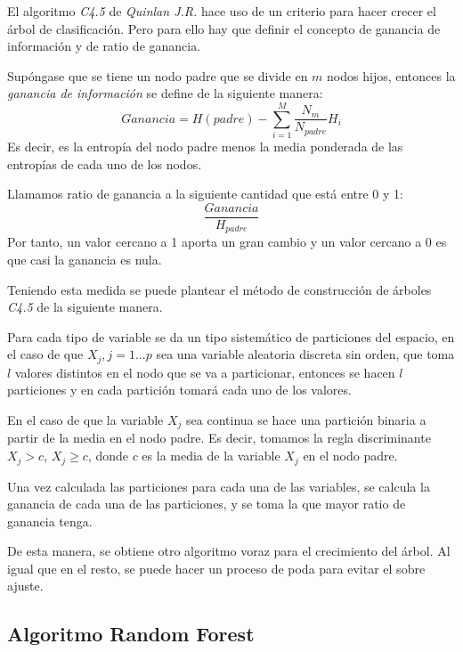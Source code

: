 \noindent El algoritmo \emph{C4.5} de \emph{Quinlan J.R.}\cite{Quinlan 2014} hace uso de un criterio para hacer crecer el árbol de clasificación. Pero para ello hay que definir el concepto de ganancia de información y de ratio de ganancia.
\begin{defi}
Supóngase que se tiene un nodo padre que se divide en $m$ nodos hijos, entonces la \emph{ganancia de información } se define de la siguiente manera: 
\begin{equation}
Ganancia=H(padre)-\sum_{i=1}^M \dfrac{N_m}{N_{padre}}H_i
\end{equation}
\noindent Es decir, es la entropía del nodo padre menos la media ponderada de las entropías de cada uno de los nodos. 
\end{defi}

\begin{defi}
Llamamos ratio de ganancia a la siguiente cantidad que está entre 0 y 1:
\begin{equation}
\dfrac{Ganancia}{H_{padre}}
\end{equation}
Por tanto, un valor cercano a 1  aporta un gran cambio y un valor cercano a 0 es que casi la ganancia es nula.   
\end{defi}

\noindent Teniendo esta medida se puede plantear el método de construcción de árboles \emph{C4.5} \cite{Loh 2014} de la siguiente manera.

\noindent Para cada tipo de variable se da un tipo sistemático de particiones del espacio, en el caso de que $X_j, j=1\ldots p$ sea una variable aleatoria discreta sin orden, que toma $l$ valores distintos en el nodo que se va a particionar, entonces se hacen $l$ particiones y en cada partición tomará cada uno de los valores. 

\noindent En el caso de que la variable $X_j$ sea continua se hace una partición binaria a partir de la media en el nodo padre. Es decir, tomamos la regla discriminante $X_j>c$, $X_j\geq c$, donde $c$ es la media de la variable $X_j$ en el nodo padre. 

\noindent Una vez calculada las particiones para cada una de las variables, se calcula la ganancia de cada una de las particiones, y se toma la que mayor ratio de ganancia tenga. 

\noindent De esta manera, se obtiene otro algoritmo voraz para el crecimiento del árbol. Al igual que en el resto, se puede hacer un proceso de poda para evitar el sobre ajuste. 


\subsection{Algoritmo Random Forest}

